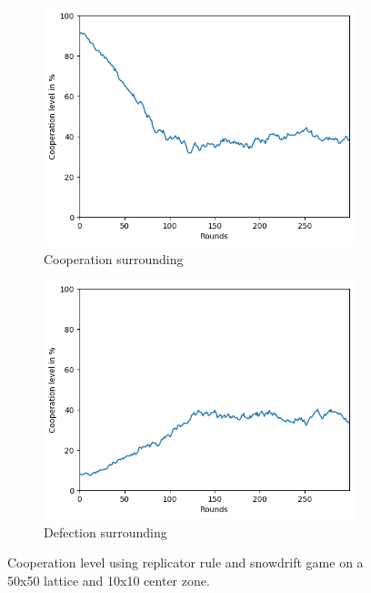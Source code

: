 \documentclass[letterpaper]{article}
\begin{document}
\begin{figure}[H]
    \begin{subfigure}{.5\textwidth}
        \centering
        \includegraphics[width=1\linewidth]
        {images/assign2/part32-coop/coop.png}
        \caption{Cooperation surrounding}
        \label{fig:part32-coop}
    \end{subfigure}
    \begin{subfigure}{.5\textwidth}
        \centering
        \includegraphics[width=1\linewidth]
        {images/assign2/part32-defect/coop.png}
        \caption{Defection surrounding}
        \label{fig:part32-defect}
    \end{subfigure}
    \caption{Cooperation level using replicator rule and
    snowdrift game on a 50x50 lattice and 10x10 center zone.}
\end{figure}
\end{document}
